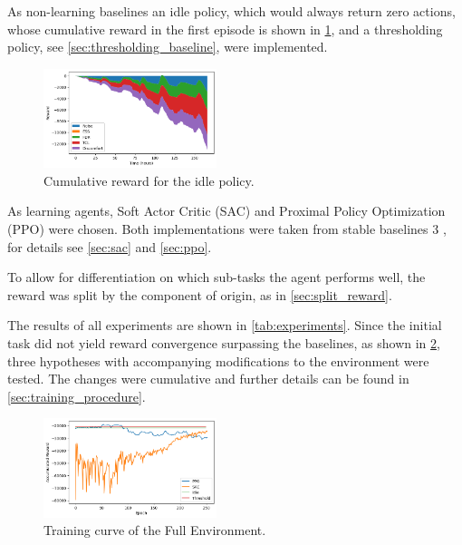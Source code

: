 As non-learning baselines an idle policy, which would always return zero actions, whose cumulative reward in the first episode is shown in \cref{fig:reward_idle}, and a thresholding policy, see \cref{sec:thresholding_baseline}, were implemented.

\begin{figure}[H]
    \centering
    \includegraphics[width=0.45\textwidth]{figures/idle_reward.png}
    \caption{Cumulative reward for the idle policy.}
    \label{fig:reward_idle}
\end{figure}

As learning agents, Soft Actor Critic (SAC) \cite{Haarnoja.04.01.2018} and Proximal Policy Optimization (PPO) \cite{Schulman.20.07.2017} were chosen. Both implementations were taken from stable baselines 3 \cite{AntoninRaffin.2021}, for details see \cref{sec:sac} and \cref{sec:ppo}.
\par
To allow for differentiation on which sub-tasks the agent performs well, the reward was split by the component of origin, as in \cref{sec:split_reward}. 
\par
The results of all experiments are shown in \cref{tab:experiments}. Since the initial task did not yield reward convergence surpassing the baselines, as shown in \cref{fig:training_curve}, three hypotheses with accompanying modifications to the environment were tested. The changes were cumulative and further details can be found in \cref{sec:training_procedure}.
\begin{figure}[H]
    \centering
    \setlength{\abovecaptionskip}{0pt}
    \includegraphics[width=0.45\textwidth]{figures/training_curve.png}
    \caption{Training curve of the Full Environment.}
    \label{fig:training_curve}
\end{figure}


